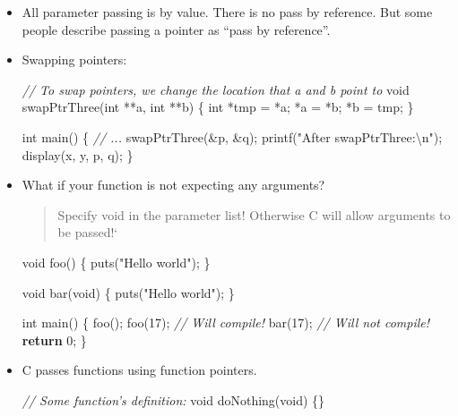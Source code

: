 \documentclass[]{article}
\newenvironment{Shaded}{}{}
\newcommand{\DataTypeTok}[1]{\textcolor[rgb]{0.56,0.13,0.00}{#1}}
\newcommand{\DecValTok}[1]{\textcolor[rgb]{0.25,0.63,0.44}{#1}}
\newcommand{\SpecialCharTok}[1]{\textcolor[rgb]{0.25,0.44,0.63}{#1}}
\newcommand{\StringTok}[1]{\textcolor[rgb]{0.25,0.44,0.63}{#1}}
\newcommand{\CommentTok}[1]{\textcolor[rgb]{0.38,0.63,0.69}{\textit{#1}}}
\newcommand{\ControlFlowTok}[1]{\textcolor[rgb]{0.00,0.44,0.13}{\textbf{#1}}}
\newcommand{\NormalTok}[1]{#1}
\begin{document}
\begin{itemize}
\item
  All parameter passing is by value. There is no pass by reference. But
  some people describe passing a pointer as ``pass by reference''.
\item
  Swapping pointers:

\begin{Shaded}
\begin{Highlighting}[]
\CommentTok{// To swap pointers, we change the location that a and b point to}
\DataTypeTok{void}\NormalTok{ swapPtrThree(}\DataTypeTok{int}\NormalTok{ **a, }\DataTypeTok{int}\NormalTok{ **b) \{}
    \DataTypeTok{int}\NormalTok{ *tmp = *a;}
\NormalTok{    *a = *b;}
\NormalTok{    *b = tmp;}
\NormalTok{\}}

\DataTypeTok{int}\NormalTok{ main() \{}
    \CommentTok{// ...}
\NormalTok{    swapPtrThree(&p, &q);}
\NormalTok{    printf(}\StringTok{"After swapPtrThree:}\SpecialCharTok{\textbackslash{}n}\StringTok{"}\NormalTok{);}
\NormalTok{    display(x, y, p, q);}
\NormalTok{\}}
\end{Highlighting}
\end{Shaded}
\item
  What if your function is not expecting any arguments?

  \begin{quote}
  Specify void in the parameter list! Otherwise C will allow arguments
  to be passed!`
  \end{quote}

\begin{Shaded}
\begin{Highlighting}[]
\DataTypeTok{void}\NormalTok{ foo() \{}
\NormalTok{    puts(}\StringTok{"Hello world"}\NormalTok{);}
\NormalTok{\}}

\DataTypeTok{void}\NormalTok{ bar(}\DataTypeTok{void}\NormalTok{) \{}
\NormalTok{    puts(}\StringTok{"Hello world"}\NormalTok{);}
\NormalTok{\}}

\DataTypeTok{int}\NormalTok{ main() \{}
\NormalTok{    foo();}
\NormalTok{    foo(}\DecValTok{17}\NormalTok{); 	}\CommentTok{// Will compile!}
\NormalTok{    bar(}\DecValTok{17}\NormalTok{); 	}\CommentTok{// Will not compile!}
    \ControlFlowTok{return} \DecValTok{0}\NormalTok{;}
\NormalTok{\}}
\end{Highlighting}
\end{Shaded}
\item
  C passes functions using function pointers.

\begin{Shaded}
\begin{Highlighting}[]
\CommentTok{// Some function’s definition:}
\DataTypeTok{void}\NormalTok{ doNothing(}\DataTypeTok{void}\NormalTok{) \{\}}


\end{Highlighting}
\end{Shaded}
\end{itemize}
\end{document}
